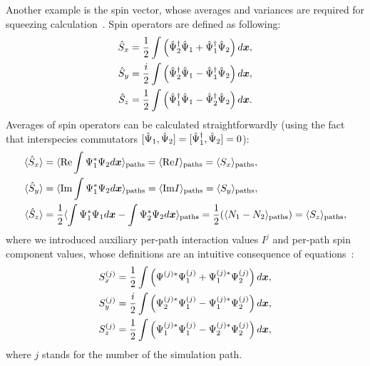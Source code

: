 Another example is the spin vector, whose averages and variances are required for squeezing calculation~\cite{Li2009}.
Spin operators are defined as following:
\begin{equation}
\label{eqn:moments-calculation:spin-operators}
\begin{split}
	\hat{S}_x & = \frac{1}{2} \int \left(
		\hat{\Psi}^\dagger_2 \hat{\Psi}_1 + \hat{\Psi}^\dagger_1 \hat{\Psi}_2
	\right) d\boldsymbol{x}, \\
	\hat{S}_y & = \frac{i}{2} \int \left(
		\hat{\Psi}^\dagger_2 \hat{\Psi}_1 - \hat{\Psi}^\dagger_1 \hat{\Psi}_2
	\right) d\boldsymbol{x}, \\
	\hat{S}_z & = \frac{1}{2} \int \left(
		\hat{\Psi}^\dagger_1 \hat{\Psi}_1 - \hat{\Psi}^\dagger_2 \hat{\Psi}_2
	\right) d\boldsymbol{x}.
\end{split}
\end{equation}
Averages of spin operators can be calculated straightforwardly (using the fact that interspecies commutators $[\hat{\Psi}_1, \hat{\Psi}_2] = [\hat{\Psi}^\dagger_1, \hat{\Psi}_2] = 0$):
\begin{equation*}
\begin{split}
	\langle \hat{S}_x \rangle
		& = \langle \mathrm{Re} \int \Psi^*_1 \Psi_2 d\boldsymbol{x}  \rangle_{\mathrm{paths}}
		= \langle \mathrm{Re} I \rangle_{\mathrm{paths}}
		= \langle S_x \rangle_{\mathrm{paths}}, \\
	\langle \hat{S}_y \rangle
		& = \langle \mathrm{Im} \int \Psi^*_1 \Psi_2 d\boldsymbol{x}  \rangle_{\mathrm{paths}}
		= \langle \mathrm{Im} I \rangle_{\mathrm{paths}}
		= \langle S_y \rangle_{\mathrm{paths}}, \\
	\langle \hat{S}_z \rangle
		& = \frac{1}{2} \langle \int \Psi^*_1 \Psi_1 d\boldsymbol{x} - \int \Psi^*_2 \Psi_2 d\boldsymbol{x} \rangle_{\mathrm{paths}}
		= \frac{1}{2} (\langle N_1 - N_2 \rangle_{\mathrm{paths}})
		= \langle S_z \rangle_{\mathrm{paths}},
\end{split}
\end{equation*}
where we introduced auxiliary per-path interaction values $I^{j}$ and per-path spin component values, whose definitions are an intuitive consequence of equations~:
\begin{equation*}
\begin{split}
	S^{(j)}_x & = \frac{1}{2} \int \left(
		\Psi^{(j)*} \Psi^{(j)}_1 + \Psi^{(j)*}_1 \Psi^{(j)}_2
	\right) d\boldsymbol{x}, \\
	S^{(j)}_y & = \frac{i}{2} \int \left(
		\Psi^{(j)*}_2 \Psi^{(j)}_1 - \Psi^{(j)*}_1 \Psi^{(j)}_2
	\right) d\boldsymbol{x}, \\
	S^{(j)}_z & = \frac{1}{2} \int \left(
		\Psi^{(j)*}_1 \Psi^{(j)}_1 - \Psi^{(j)*}_2 \Psi^{(j)}_2
	\right) d\boldsymbol{x},
\end{split}
\end{equation*}
where $j$ stands for the number of the simulation path.

